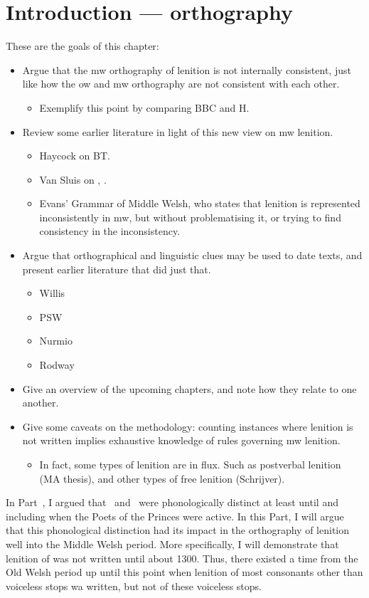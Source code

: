 \chapter{Introduction --- orthography}
\label{cha:intr-orth}
These are the goals of this chapter: 
\begin{itemize}
\item Argue that the \gls{mw} orthography of lenition is not internally consistent, just like how the \gls{ow} and \gls{mw} orthography are not consistent with each other.
  \begin{itemize}
  \item Exemplify this point by comparing BBC and H.
  \end{itemize}
\item Review some earlier literature in light of this new view on \gls{mw} lenition.
  \begin{itemize}
  \item Haycock on BT.
  \item Van Sluis on \ei, \oes.
  \item Evans' Grammar of Middle Welsh, who states that lenition is represented inconsistently in \gls{mw}, but without problematising it, or trying to find consistency in the inconsistency.
  \end{itemize}
\item Argue that orthographical and linguistic clues may be used to date texts, and present earlier literature that did just that.
  \begin{itemize}
  \item Willis
  \item PSW
  \item Nurmio
  \item Rodway
  \end{itemize}
\item Give an overview of the upcoming chapters, and note how they relate to one another.
\item Give some caveats on the methodology: counting instances where lenition is not written implies exhaustive knowledge of rules governing \gls{mw} lenition.
  \begin{itemize}
  \item In fact, some types of lenition are in flux. Such as postverbal lenition (MA thesis), and other types of free lenition (Schrijver).
  \end{itemize}
\end{itemize}
In Part~, I argued that \lT\ and \xD\ were phonologically distinct at least until and including when the Poets of the Princes were active. In this Part, I will argue that this phonological distinction had its impact in the orthography of lenition well into the Middle Welsh period. More specifically, I will demonstrate that lenition of  was not written until about 1300. Thus, there existed a time from the Old Welsh period up until this point when lenition of most consonants other than voiceless stops wa written, but not of these voiceless stops.

